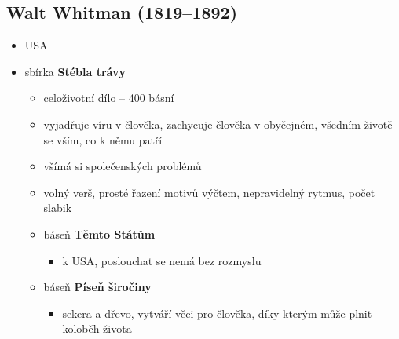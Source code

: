 \subsection{Walt Whitman (1819--1892)}
\begin{itemize}
\item USA
\item sbírka \textbf{Stébla trávy}
	\begin{itemize}
	\item celoživotní dílo -- 400 básní
	\item vyjadřuje víru v člověka, zachycuje člověka v obyčejném, všedním životě se vším, co k němu patří
	\item všímá si společenských problémů
	\item volný verš, prosté řazení motivů výčtem, nepravidelný rytmus, počet slabik
	\item báseň  \textbf{Těmto Státům}
		\begin{itemize}
		\item k USA, poslouchat se nemá bez rozmyslu
		\end{itemize}
	\item báseň \textbf{Píseň širočiny}
		\begin{itemize}
		\item sekera a dřevo, vytváří věci pro člověka, díky kterým může plnit koloběh života
		\end{itemize}
	\end{itemize}
\end{itemize}


